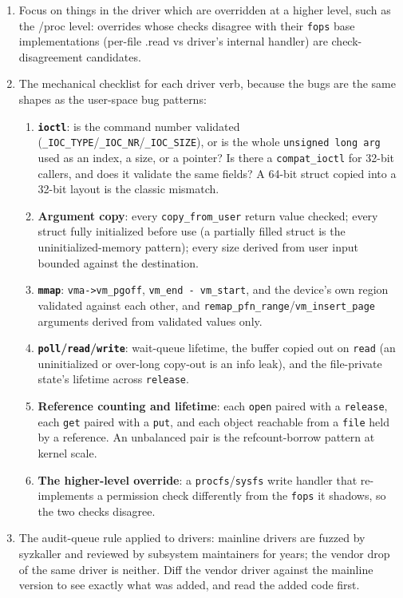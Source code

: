 \documentclass[12pt]{Training}
\begin{document}
\begin{enumerate}
    \item Focus on things in the driver which are overridden at a higher level, such as the /proc level: overrides whose checks disagree with their \lstinline{fops} base implementations (per-file .read vs driver's internal handler) are check-disagreement candidates.
    \item The mechanical checklist for each driver verb, because the bugs are the same shapes as the user-space bug patterns:
    \begin{enumerate}
        \item \textbf{\lstinline{ioctl}}: is the command number validated (\lstinline{_IOC_TYPE}/\lstinline{_IOC_NR}/\lstinline{_IOC_SIZE}), or is the whole \lstinline{unsigned long arg} used as an index, a size, or a pointer? Is there a \lstinline{compat_ioctl} for 32-bit callers, and does it validate the same fields? A 64-bit struct copied into a 32-bit layout is the classic mismatch.
        \item \textbf{Argument copy}: every \lstinline{copy_from_user} return value checked; every struct fully initialized before use (a partially filled struct is the uninitialized-memory pattern); every size derived from user input bounded against the destination.
        \item \textbf{\lstinline{mmap}}: \lstinline{vma->vm_pgoff}, \lstinline{vm_end - vm_start}, and the device's own region validated against each other, and \lstinline{remap_pfn_range}/\lstinline{vm_insert_page} arguments derived from validated values only.
        \item \textbf{\lstinline{poll}/\lstinline{read}/\lstinline{write}}: wait-queue lifetime, the buffer copied out on \lstinline{read} (an uninitialized or over-long copy-out is an info leak), and the file-private state's lifetime across \lstinline{release}.
        \item \textbf{Reference counting and lifetime}: each \lstinline{open} paired with a \lstinline{release}, each \lstinline{get} paired with a \lstinline{put}, and each object reachable from a \lstinline{file} held by a reference. An unbalanced pair is the refcount-borrow pattern at kernel scale.
        \item \textbf{The higher-level override}: a \lstinline{procfs}/\lstinline{sysfs} write handler that re-implements a permission check differently from the \lstinline{fops} it shadows, so the two checks disagree.
    \end{enumerate}
    \item The audit-queue rule applied to drivers: mainline drivers are fuzzed by syzkaller and reviewed by subsystem maintainers for years; the vendor drop of the same driver is neither. Diff the vendor driver against the mainline version to see exactly what was added, and read the added code first.

\end{enumerate}
\end{document}
